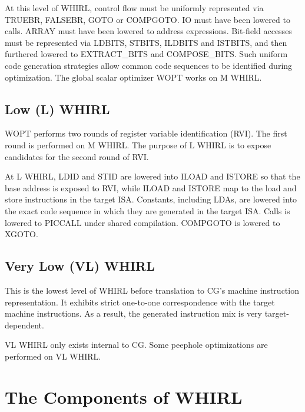 \documentclass{article}
\begin{document}
At this level of WHIRL, control flow must be uniformly represented
via
%
TRUEBR, 
%
FALSEBR,
%
GOTO or
%
COMPGOTO.
%
IO must have been lowered
to calls.
%
ARRAY must have been lowered to address expressions. Bit-field accesses
must be represented via
%
LDBITS,
%
STBITS,
%
ILDBITS and
%
ISTBITS, and then furthered lowered to
%
EXTRACT\_BITS and 
%
COMPOSE\_BITS. Such uniform code generation strategies
allow common code sequences to be
identified during optimization. The global scalar optimizer WOPT
works on M WHIRL.

\subsection{Low (L) WHIRL}

WOPT performs two rounds of register variable identification (RVI).
The first round is performed on M WHIRL. The purpose of L WHIRL is
to expose candidates for the second round of RVI. 

At L WHIRL,
%
LDID
and
%
STID are lowered into
%
ILOAD and
%
ISTORE so that the base address
is exposed to RVI, while
%
ILOAD and
%
ISTORE map to the load and store instructions in the target
ISA. Constants, including
%
LDAs, are lowered into the exact code sequence in which they are
generated in
the target ISA. Calls is lowered to
%
PICCALL under shared compilation.
%
COMPGOTO is lowered to
%
XGOTO.

\subsection{Very Low (VL) WHIRL}

This is the lowest level of WHIRL before translation to CG's machine
instruction representation. It exhibits strict one-to-one
correspondence with the target machine instructions. As a result, the generated
instruction mix is very target-dependent.

VL WHIRL only exists internal to CG. Some peephole optimizations
are performed on VL WHIRL.

\section{The Components of WHIRL}
\end{document}
